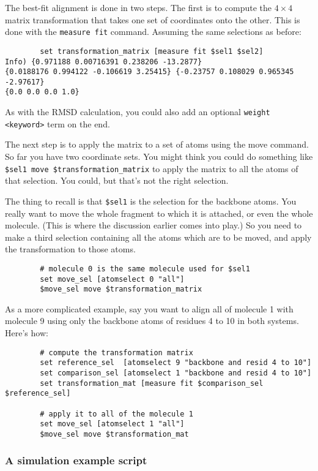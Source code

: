 The best-fit alignment is done in two steps.  The first is to compute
the $4\times4$ matrix transformation that takes one set of coordinates onto
the other.  This is done with the {\tt measure fit} command.  Assuming the
same selections as before:
{\tt \begin{verbatim}
        set transformation_matrix [measure fit $sel1 $sel2]
Info) {0.971188 0.00716391 0.238206 -13.2877}
{0.0188176 0.994122 -0.106619 3.25415} {-0.23757 0.108029 0.965345 -2.97617}
{0.0 0.0 0.0 1.0}
\end{verbatim}
}
As with the RMSD calculation, you could also add an optional {\tt weight
<keyword>} term on the end.

The next step is to apply the matrix to a set of atoms using the move
command.  So far you have two coordinate sets.  You might think you
could do something like {\tt \$sel1 move \$transformation\_matrix} to apply
the matrix to all the atoms of that selection.  You could, but that's
not the right selection.

The thing to recall is that {\tt \$sel1} is the selection for the backbone
atoms.  You really want to move the whole fragment to which it is
attached, or even the whole molecule.  (This is where the discussion
earlier comes into play.)  So you need to make a third selection
containing all the atoms which are to be moved, and apply the
transformation to those atoms.
{\tt \begin{verbatim}
        # molecule 0 is the same molecule used for $sel1
        set move_sel [atomselect 0 "all"]
        $move_sel move $transformation_matrix
\end{verbatim}}

As a more complicated example, say you want to  
align all of molecule 1 with molecule 9 using only the backbone
atoms of residues 4 to 10 in both systems.  Here's how:
{\tt \begin{verbatim}
        # compute the transformation matrix
        set reference_sel  [atomselect 9 "backbone and resid 4 to 10"]
        set comparison_sel [atomselect 1 "backbone and resid 4 to 10"]
        set transformation_mat [measure fit $comparison_sel $reference_sel]

        # apply it to all of the molecule 1
        set move_sel [atomselect 1 "all"]
        $move_sel move $transformation_mat
\end{verbatim} }

\subsubsection{A simulation example script}

